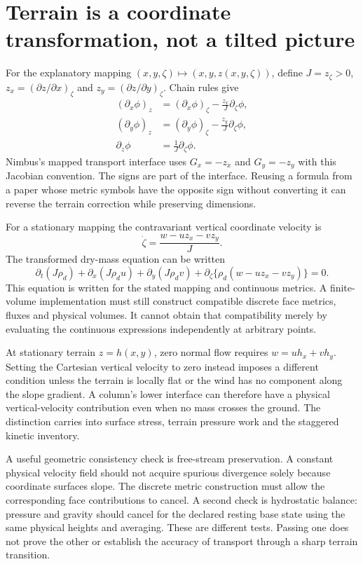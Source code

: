 \section{Terrain is a coordinate transformation, not a tilted picture}

For the explanatory mapping $(x,y,\zeta)\mapsto(x,y,z(x,y,\zeta))$, define
$J=z_\zeta>0$, $z_x=(\partial z/\partial x)_\zeta$ and
$z_y=(\partial z/\partial y)_\zeta$. Chain rules give
\[
 \begin{aligned}
 (\partial_x\phi)_z&=(\partial_x\phi)_\zeta
                         -\frac{z_x}{J}\partial_\zeta\phi,\\
 (\partial_y\phi)_z&=(\partial_y\phi)_\zeta
                         -\frac{z_y}{J}\partial_\zeta\phi,\\
 \partial_z\phi&=\frac{1}{J}\partial_\zeta\phi.
 \end{aligned}
\]
Nimbus's mapped transport interface uses $G_x=-z_x$ and $G_y=-z_y$ with this
Jacobian convention. The signs are part of the interface. Reusing a formula
from a paper whose metric symbols have the opposite sign without converting
it can reverse the terrain correction while preserving dimensions.

For a stationary mapping the contravariant vertical coordinate velocity is
\[
 \dot\zeta=\frac{w-u z_x-v z_y}{J}.
\]
The transformed dry-mass equation can be written
\[
 \partial_t(J\rho_d)+\partial_x(J\rho_d u)
 +\partial_y(J\rho_d v)
 +\partial_\zeta\{\rho_d(w-u z_x-v z_y)\}=0.
\]
This equation is written for the stated mapping and continuous metrics. A
finite-volume implementation must still construct compatible discrete face
metrics, fluxes and physical volumes. It cannot obtain that compatibility merely
by evaluating the continuous expressions independently at arbitrary points.

At stationary terrain $z=h(x,y)$, zero normal flow requires
$w=u h_x+v h_y$. Setting the Cartesian vertical velocity to zero instead imposes
a different condition unless the terrain is locally flat or the wind has no
component along the slope gradient. A column's lower interface can therefore
have a physical vertical-velocity contribution even when no mass crosses the
ground. The distinction carries into surface stress, terrain pressure work and
the staggered kinetic inventory.

A useful geometric consistency check is free-stream preservation. A constant
physical velocity field should not acquire spurious divergence solely because
coordinate surfaces slope. The discrete metric construction must allow the
corresponding face contributions to cancel. A second check is hydrostatic
balance: pressure and gravity should cancel for the declared resting base
state using the same physical heights and averaging. These are different tests.
Passing one does not prove the other or establish the accuracy of transport
through a sharp terrain transition.

